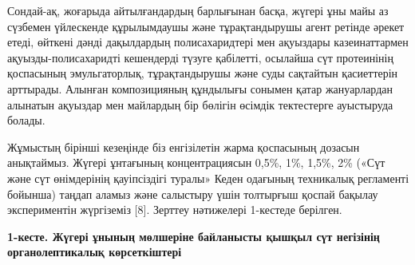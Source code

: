 \begin{multicols}{2}
Сондай-ақ, жоғарыда айтылғандардың барлығынан басқа, жүгері ұны майы аз
сүзбемен үйлескенде құрылымдаушы және тұрақтандырушы агент ретінде
әрекет етеді, өйткені дәнді дақылдардың полисахаридтері мен ақуыздары
казеинаттармен ақуызды-полисахаридті кешендерді түзуге қабілетті,
осылайша сүт протеинінің қоспасының эмульгаторлық, тұрақтандырушы және
суды сақтайтын қасиеттерін арттырады. Алынған композицияның құндылығы
сонымен қатар жануарлардан алынатын ақуыздар мен майлардың бір бөлігін
өсімдік тектестерге ауыстыруда болады.

Жұмыстың бірінші кезеңінде біз енгізілетін жарма қоспасының дозасын
анықтаймыз. Жүгері ұнтағының концентрациясын 0,5\%, 1\%, 1,5\%, 2\%
(«Сүт және сүт өнімдерінің қауіпсіздігі туралы» Кеден одағының
техникалық регламенті бойынша) таңдап аламыз және салыстыру үшін
толтырғыш қоспай бақылау экспериментін жүргіземіз {[}8{]}. Зерттеу
нәтижелері 1-кестеде берілген.
\end{multicols}

{\bfseries 1-кесте. Жүгері ұнының мөлшеріне байланысты қышқыл сүт негізінің органолептикалық көрсеткіштері}

